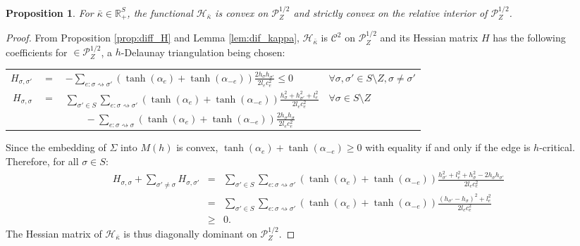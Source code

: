 \documentclass[a4paper,12pt]{article}
\def\adm{\P}
\def\RR{\mathbb{R}}
\def\adm{\mathcal{P}}
\def\P{\mathcal{P}}
\newtheorem{prop}[lem]{Proposition}
\theoremstyle{definition}
\begin{document}
%
		\begin{prop}\label{prop:H_convexe}
					 For $\bar\kappa\in \RR_+^S$, the functional $\mathcal{H}_{\bar\kappa}$ is convex on $\adm_Z^{1/2}$ and strictly convex on
					 the relative interior of $\adm_Z^{1/2}$.
					\end{prop}
					
					\begin{proof}
					 From Proposition \ref{prop:diff_H} and Lemma \ref{lem:dif_kappa}, $\mathcal{H}_{\bar\kappa}$ is $\mathscr C^2$ on $\adm^{1/2}_Z$ and 
					 its Hessian matrix $H$ has the following coefficients for $ \in \adm_Z^{1/2}$, a $h$-Delaunay triangulation being chosen:
						\begin{center}
					 \begin{tabular}{rcll}
					 $\displaystyle H_{\sigma,{\sigma'}}$ &$\displaystyle=$ &$\displaystyle-\sum_{e:\sigma\rightsquigarrow {\sigma'}}
					 \left(\tanh(\alpha_e)+\tanh(\alpha_{-e})\right)
					 \frac{ 2 h_{\sigma} h_{{\sigma'}} }{2 l_e c_e^2} \leq0$ & $\displaystyle\forall \sigma,{\sigma'}\in S\setminus Z,\sigma\neq {\sigma'}$\\
					$\displaystyle H_{\sigma,\sigma}$&$\displaystyle=$&$\displaystyle\sum_{{\sigma'}\in S}\sum_{e:\sigma\rightsquigarrow {\sigma'}}
					\left( \tanh(\alpha_e)+\tanh(\alpha_{-e})\right)\frac{ h_{\sigma}^2 +h_{{\sigma'}}^2+l_e^2 }{2 l_e c_e^2} $&$\displaystyle\forall \sigma\in S\setminus Z$\\
					&&$\displaystyle\quad\quad-\sum_{e:\sigma\rightsquigarrow \sigma}
					\left(\tanh(\alpha_e)+\tanh(\alpha_{-e})\right) \frac{ 2 h_{\sigma} h_{\sigma} }{2 l_e c_e^2} $&
					\end{tabular}
					 \end{center}
					 Since the embedding of $\Sigma$ into $M(h)$ is convex, $\tanh(\alpha_e)+\tanh(\alpha_{-e})\geq 0$ with equality if and only if the edge is $h$-critical.
					 Therefore, for all $\sigma\in S$:
					 \begin{eqnarray*}
					 H_{\sigma,\sigma} + \sum_{\sigma'\neq \sigma} H_{\sigma,\sigma'}&=& \sum_{\sigma'\in S} \sum_{e:\sigma\rightsquigarrow \sigma'}
					 \left(\tanh(\alpha_e)+\tanh(\alpha_{-e})\right) \frac{h_{\sigma'}^2+l_e^2 + h_{\sigma}^2 - 2 h_{\sigma} h_{\sigma'} }{2 l_e c_e^2}\\
					&=&\sum_{\sigma'\in S} \sum_{e:\sigma\rightsquigarrow \sigma'}
					 \left(\tanh(\alpha_e)+\tanh(\alpha_{-e})\right) \frac{(h_{\sigma'}-h_{\sigma})^2 +l_e^2 }{2 l_e c_e^2}\\
					&\geq&0.
					 \end{eqnarray*}
					The Hessian matrix of $\mathcal{H}_{\bar\kappa}$ is thus diagonally dominant on $\P_Z^{1/2}$.


\end{proof}
\end{document}
